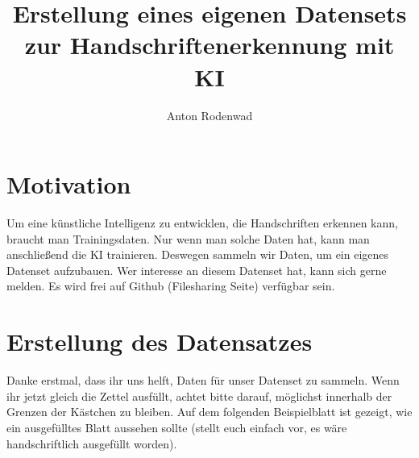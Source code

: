\documentclass[a4paper]{article}
\begin{document}
\author{Anton Rodenwad}
\title{Erstellung eines eigenen Datensets zur Handschriftenerkennung mit KI}
\date{}

\maketitle

\thispagestyle{empty}


\section{Motivation}
Um eine künstliche Intelligenz zu entwicklen, die Handschriften erkennen kann,
braucht man Trainingsdaten. Nur wenn man solche Daten hat, kann man
anschließend die KI trainieren. Deswegen sammeln wir Daten,
um ein eigenes Datenset aufzubauen.
Wer interesse an diesem Datenset hat, kann sich gerne melden.
Es wird frei auf Github (Filesharing Seite) verfügbar sein.

\section{Erstellung des Datensatzes}
Danke erstmal, dass ihr uns helft, Daten für unser Datenset zu sammeln.
Wenn ihr jetzt gleich die Zettel ausfüllt, achtet bitte darauf, möglichst
innerhalb der Grenzen der Kästchen zu bleiben.
Auf dem folgenden Beispielblatt ist gezeigt, wie ein ausgefülltes Blatt
aussehen sollte (stellt euch einfach vor, es wäre handschriftlich ausgefüllt
worden).
\end{document}
